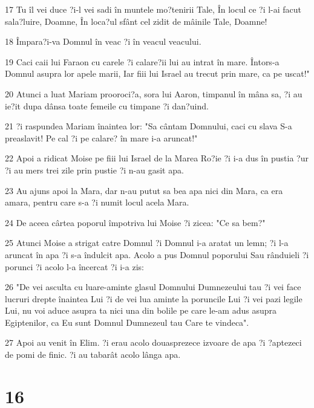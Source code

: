 \par 17 Tu îl vei duce ?i-l vei sadi în muntele mo?tenirii Tale, În locul ce ?i l-ai facut sala?luire, Doamne, În loca?ul sfânt cel zidit de mâinile Tale, Doamne!
\par 18 Împara?i-va Domnul în veac ?i în veacul veacului.
\par 19 Caci caii lui Faraon cu carele ?i calare?ii lui au intrat în mare. Întors-a Domnul asupra lor apele marii, Iar fiii lui Israel au trecut prin mare, ca pe uscat!"
\par 20 Atunci a luat Mariam prooroci?a, sora lui Aaron, timpanul în mâna sa, ?i au ie?it dupa dânsa toate femeile cu timpane ?i dan?uind.
\par 21 ?i raspundea Mariam înaintea lor: "Sa cântam Domnului, caci cu slava S-a preaslavit! Pe cal ?i pe calare? în mare i-a aruncat!"
\par 22 Apoi a ridicat Moise pe fiii lui Israel de la Marea Ro?ie ?i i-a dus în pustia ?ur ?i au mers trei zile prin pustie ?i n-au gasit apa.
\par 23 Au ajuns apoi la Mara, dar n-au putut sa bea apa nici din Mara, ca era amara, pentru care s-a ?i numit locul acela Mara.
\par 24 De aceea cârtea poporul împotriva lui Moise ?i zicea: "Ce sa bem?"
\par 25 Atunci Moise a strigat catre Domnul ?i Domnul i-a aratat un lemn; ?i l-a aruncat în apa ?i s-a îndulcit apa. Acolo a pus Domnul poporului Sau rânduieli ?i porunci ?i acolo l-a încercat ?i i-a zis:
\par 26 "De vei asculta cu luare-aminte glasul Domnului Dumnezeului tau ?i vei face lucruri drepte înaintea Lui ?i de vei lua aminte la poruncile Lui ?i vei pazi legile Lui, nu voi aduce asupra ta nici una din bolile pe care le-am adus asupra Egiptenilor, ca Eu sunt Domnul Dumnezeul tau Care te vindeca".
\par 27 Apoi au venit în Elim. ?i erau acolo douasprezece izvoare de apa ?i ?aptezeci de pomi de finic. ?i au tabarât acolo lânga apa.

\chapter{16}

